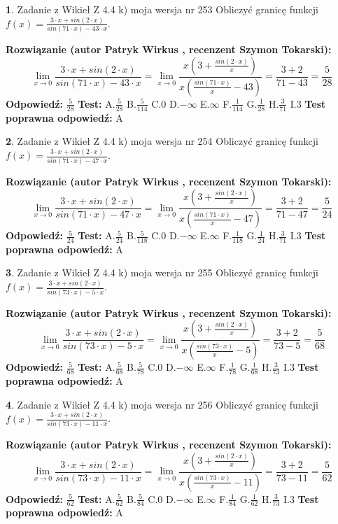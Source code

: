 \documentclass[12pt, a4paper]{article}
\theoremstyle{definition} %
\newtheorem{zad}{}
\newcommand{\zadStart}[1]{\begin{zad}#1\newline}
\newcommand{\zadStop}{\end{zad}}
\newcommand{\rozwStart}[2]{\noindent \textbf{Rozwiązanie (autor #1 , recenzent #2): }\newline}
\newcommand{\rozwStop}{\newline}
\newcommand{\odpStart}{\noindent \textbf{Odpowiedź:}\newline}
\newcommand{\odpStop}{\newline}
\newcommand{\testStart}{\noindent \textbf{Test:}\newline}
\newcommand{\testStop}{\newline}
\newcommand{\kluczStart}{\noindent \textbf{Test poprawna odpowiedź:}\newline}
\newcommand{\kluczStop}{\newline}
\begin{document}
\zadStart{Zadanie z Wikieł Z 4.4 k) moja wersja nr 253}
Obliczyć granicę funkcji $f(x)=\frac{3\cdot x +sin(2\cdot x)}{sin(71\cdot x) -43\cdot x}$.
\zadStop
\rozwStart{Patryk Wirkus}{Szymon Tokarski}
$$\lim\limits_{x\to 0}\frac{3\cdot x +sin(2\cdot x)}{sin(71\cdot x) -43\cdot x}
=\lim\limits_{x\to 0}\frac{x(3+\frac{sin(2\cdot x)}{x})}{x(\frac{sin(71\cdot x)}{x}-43)}
=\frac{3+2}{71-43} = \frac{5}{28}$$
\rozwStop
\odpStart
$\frac{5}{28}$
\odpStop
\testStart
A.$\frac{5}{28}$
B.$\frac{5}{114}$
C.$0$
D.$-\infty$
E.$\infty$
F.$\frac{1}{114}$
G.$\frac{1}{28}$
H.$\frac{3}{71}$
I.$3$
\testStop
\kluczStart
A
\kluczStop



\zadStart{Zadanie z Wikieł Z 4.4 k) moja wersja nr 254}
Obliczyć granicę funkcji $f(x)=\frac{3\cdot x +sin(2\cdot x)}{sin(71\cdot x) -47\cdot x}$.
\zadStop
\rozwStart{Patryk Wirkus}{Szymon Tokarski}
$$\lim\limits_{x\to 0}\frac{3\cdot x +sin(2\cdot x)}{sin(71\cdot x) -47\cdot x}
=\lim\limits_{x\to 0}\frac{x(3+\frac{sin(2\cdot x)}{x})}{x(\frac{sin(71\cdot x)}{x}-47)}
=\frac{3+2}{71-47} = \frac{5}{24}$$
\rozwStop
\odpStart
$\frac{5}{24}$
\odpStop
\testStart
A.$\frac{5}{24}$
B.$\frac{5}{118}$
C.$0$
D.$-\infty$
E.$\infty$
F.$\frac{1}{118}$
G.$\frac{1}{24}$
H.$\frac{3}{71}$
I.$3$
\testStop
\kluczStart
A
\kluczStop



\zadStart{Zadanie z Wikieł Z 4.4 k) moja wersja nr 255}
Obliczyć granicę funkcji $f(x)=\frac{3\cdot x +sin(2\cdot x)}{sin(73\cdot x) -5\cdot x}$.
\zadStop
\rozwStart{Patryk Wirkus}{Szymon Tokarski}
$$\lim\limits_{x\to 0}\frac{3\cdot x +sin(2\cdot x)}{sin(73\cdot x) -5\cdot x}
=\lim\limits_{x\to 0}\frac{x(3+\frac{sin(2\cdot x)}{x})}{x(\frac{sin(73\cdot x)}{x}-5)}
=\frac{3+2}{73-5} = \frac{5}{68}$$
\rozwStop
\odpStart
$\frac{5}{68}$
\odpStop
\testStart
A.$\frac{5}{68}$
B.$\frac{5}{78}$
C.$0$
D.$-\infty$
E.$\infty$
F.$\frac{1}{78}$
G.$\frac{1}{68}$
H.$\frac{3}{73}$
I.$3$
\testStop
\kluczStart
A
\kluczStop



\zadStart{Zadanie z Wikieł Z 4.4 k) moja wersja nr 256}
Obliczyć granicę funkcji $f(x)=\frac{3\cdot x +sin(2\cdot x)}{sin(73\cdot x) -11\cdot x}$.
\zadStop
\rozwStart{Patryk Wirkus}{Szymon Tokarski}
$$\lim\limits_{x\to 0}\frac{3\cdot x +sin(2\cdot x)}{sin(73\cdot x) -11\cdot x}
=\lim\limits_{x\to 0}\frac{x(3+\frac{sin(2\cdot x)}{x})}{x(\frac{sin(73\cdot x)}{x}-11)}
=\frac{3+2}{73-11} = \frac{5}{62}$$
\rozwStop
\odpStart
$\frac{5}{62}$
\odpStop
\testStart
A.$\frac{5}{62}$
B.$\frac{5}{84}$
C.$0$
D.$-\infty$
E.$\infty$
F.$\frac{1}{84}$
G.$\frac{1}{62}$
H.$\frac{3}{73}$
I.$3$
\testStop
\kluczStart
A
\kluczStop
\end{document}
